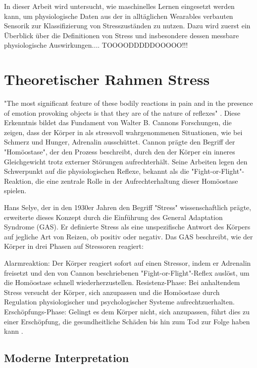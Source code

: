 In dieser Arbeit wird untersucht, wie maschinelles Lernen eingesetzt werden kann, um physiologische Daten aus der in alltäglichen Wearables verbauten Sensorik zur Klassifizierung
von Stresszuständen zu nutzen. Dazu wird zuerst ein Überblick über die Definitionen von Stress und insbesondere dessen messbare physiologische Auswirkungen....    TOOOODDDDDOOOOO!!!

\section{Theoretischer Rahmen Stress}
"The most significant feature of these bodily reactions in pain and in the presence of emotion provoking objects is that they are of the nature of reflexes" \cite{Cannon1915}. 
Diese Erkenntnis bildet das Fundament von Walter B. Cannons Forschungen, die zeigen, dass der Körper in als stressvoll wahrgenommenen Situationen, wie bei Schmerz und Hunger, 
Adrenalin ausschüttet. Cannon prägte den Begriff der "Homöostase", der den Prozess beschreibt, durch den der Körper ein inneres Gleichgewicht trotz externer Störungen aufrechterhält. 
Seine Arbeiten legen den Schwerpunkt auf die physiologischen Reflexe, bekannt als die "Fight-or-Flight"-Reaktion, die eine zentrale Rolle in der Aufrechterhaltung dieser Homöostase spielen.

Hans Selye, der in den 1930er Jahren den Begriff "Stress" wissenschaftlich prägte, erweiterte dieses Konzept durch die Einführung des General Adaptation Syndrome (GAS). Er definierte Stress als eine unspezifische Antwort des 
Körpers auf jegliche Art von Reizen, ob positiv oder negativ. Das GAS beschreibt, wie der Körper in drei Phasen auf Stressoren reagiert:

Alarmreaktion: Der Körper reagiert sofort auf einen Stressor, indem er Adrenalin freisetzt und den von Cannon beschriebenen "Fight-or-Flight"-Reflex auslöst, um die 
Homöostase schnell wiederherzustellen.
Resistenz-Phase: Bei anhaltendem Stress versucht der Körper, sich anzupassen und die Homöostase durch Regulation physiologischer und psychologischer 
Systeme aufrechtzuerhalten.
Erschöpfungs-Phase: Gelingt es dem Körper nicht, sich anzupassen, führt dies zu einer Erschöpfung, die gesundheitliche Schäden bis hin zum Tod zur Folge 
haben kann \cite{Selye1936}.

\subsection{Moderne Interpretation}

